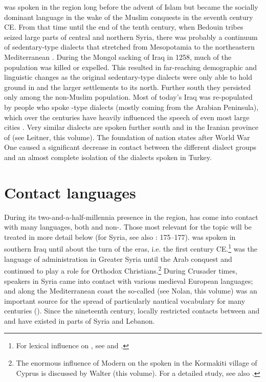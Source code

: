 \documentclass[output=paper]{langsci/langscibook}
\begin{document}
 was spoken in the region long before the advent of Islam \citep[95]{Donner1981} but became the socially dominant language in the wake of the Muslim conquests in the seventh century CE. From that time until the end of the tenth century, when Bedouin tribes seized large parts of central and northern Syria, there was probably a continuum of sedentary-type dialects that stretched from Mesopotamia to the northeastern Mediterranean \citep[291]{Procházka2018Fertile}. During the Mongol sacking of Iraq in 1258, much of the population was killed or expelled. This resulted in far-reaching demographic and linguistic changes as the original sedentary-type dialects were only able to hold ground in  and the larger settlements to its north. Further south they persisted only among the non-Muslim population. Most of today’s Iraq was re-populated by people who spoke -type dialects (mostly coming from the Arabian Peninsula), which over the centuries have heavily influenced the speech of even most large cities \citep{Holes2007}. Very similar dialects are spoken further south and in the Iranian province of  (see Leitner, this volume). The foundation of nation states after World War One caused a significant decrease in contact between the different dialect groups and an almost complete isolation of the  dialects spoken in Turkey.

\section{Contact languages} 

During its two-and-a-half-millennia presence in the region,  has come into contact with many languages, both  and non-. Those most relevant for the topic will be treated in more detail below (for Syria, see also \citealt{Barbot1961}: 175--177).  was spoken in southern Iraq until about the turn of the eras, i.e. the first century CE.\footnote{For  lexical influence on , see \citet{Holes2002} and \citet{Krebernik2008}.}  was the language of administration in Greater Syria until the Arab conquest \citep[185--187]{Magidow2013} and continued to play a role for Orthodox {Christians}.\footnote{The enormous influence of Modern  on the  spoken in the {Kormakiti} village of {Cyprus} is discussed by Walter (this volume). For a detailed study, see also \citet{Borg1985}.} During Crusader times,  speakers in Syria came into contact with various medieval European languages; and along the Mediterranean coast the so-called  (see Nolan, this volume) was an important source for the spread of particularly nautical vocabulary for many centuries (\citealt{KahaneKahaneTietze1958}). Since the nineteenth century, locally restricted contacts between  and  and  have existed in parts of Syria and Lebanon. 
\end{document}
